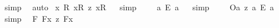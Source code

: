 \begin{isabellebody}
\isamarkupfalse%
\ {\isacharparenleft}simp{\isacharparenright}\ \isamarkupfalse%
\ auto%
\endisatagproof
{\isafoldproof}%
%
\isadelimproof
%
\endisadelimproof
\isanewline
{}\isamarkupfalse%
\ {\isachardoublequoteopen}{\isacharbrackleft}{\isasymforall}{\isacharparenleft}{\isasymlambda}x{\isachardot}\ {\isasymforall}{\isacharparenleft}{\isasymlambda}R{\isachardot}\ {\isacharparenleft}{\isacharless}{\isachardot}x{\isachardot}{\isasymcirc}{\isachardot}R{\isachardot}{\isachargreater}\ {\isasymrightarrow}\isactrlsup z\ {\isacharless}{\isachardot}x{\isachardot}{\isasymcirc}R{}{\isachargreater}{\isacharparenright}{\isacharparenright}{\isacharparenright}{\isacharbrackright}{\isachardoublequoteclose}%
\isadelimproof
\ %
\endisadelimproof
%
\isatagproof
{}\isamarkupfalse%
\ {\isacharparenleft}simp{\isacharparenright}%
\endisatagproof
{\isafoldproof}%
%
\isadelimproof
%
\endisadelimproof
\ \isamarkupfalse%
%
\isadelimproof
\ %
\endisadelimproof
%
\isatagproof
{}\isamarkupfalse%
%
\endisatagproof
{\isafoldproof}%
%
\isadelimproof
%
\endisadelimproof
\isanewline
\isanewline
{}\isamarkupfalse%
\ {\isachardoublequoteopen}{\isacharbrackleft}a\ {\isacharequal}\isactrlsub E\ a{\isacharbrackright}{\isachardoublequoteclose}%
\isadelimproof
\ %
\endisadelimproof
%
\isatagproof
{}\isamarkupfalse%
\ {\isacharparenleft}simp{\isacharparenright}%
\endisatagproof
{\isafoldproof}%
%
\isadelimproof
%
\endisadelimproof
\ \isamarkupfalse%
%
\isadelimproof
\ %
\endisadelimproof
%
\isatagproof
{}\isamarkupfalse%
%
\endisatagproof
{\isafoldproof}%
%
\isadelimproof
%
\endisadelimproof
\isanewline
\isanewline
{}\isamarkupfalse%
\ {\isachardoublequoteopen}{\isacharbrackleft}{\isacharless}O\isactrlsup {\isacharbang}{\isasymbullet}a{\isachargreater}\ {\isasymrightarrow}\isactrlsup z\ a\ {\isacharequal}\isactrlsub E\ a{\isacharbrackright}{\isachardoublequoteclose}%
\isadelimproof
\ %
\endisadelimproof
%
\isatagproof
{}\isamarkupfalse%
\ {\isacharparenleft}simp{\isacharparenright}\ \isamarkupfalse%
%
\endisatagproof
{\isafoldproof}%
%
\isadelimproof
%
\endisadelimproof
\isanewline
\isanewline
{}\isamarkupfalse%
\ {\isachardoublequoteopen}{\isacharbrackleft}{\isacharparenleft}{\isasymforall}{\isacharparenleft}{\isasymlambda}F{\isachardot}\ {\isacharless}{\isachardot}F{\isachardot}{\isasymbullet}{\isachardot}x{\isachardot}{\isachargreater}\ {\isasymequiv}\isactrlsup z\ {\isacharless}{\isachardot}F{\isachardot}{\isasymbullet}{\isachardot}x{\isachardot}{\isachargreater}{\isacharparenright}{\isacharparenright}{\isacharbrackright}{\isachardoublequoteclose}%

\end{isabellebody}
